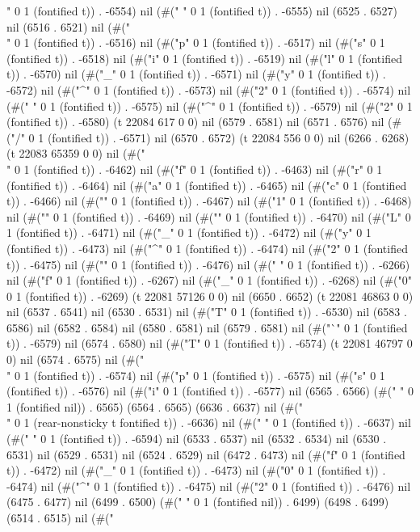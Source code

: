 " 0 1 (fontified t)) . -6554) nil (#(" " 0 1 (fontified t)) . -6555) nil (6525 . 6527) nil (6516 . 6521) nil (#("\\" 0 1 (fontified t)) . -6516) nil (#("p" 0 1 (fontified t)) . -6517) nil (#("s" 0 1 (fontified t)) . -6518) nil (#("i" 0 1 (fontified t)) . -6519) nil (#("l" 0 1 (fontified t)) . -6570) nil (#("_" 0 1 (fontified t)) . -6571) nil (#("y" 0 1 (fontified t)) . -6572) nil (#("^" 0 1 (fontified t)) . -6573) nil (#("2" 0 1 (fontified t)) . -6574) nil (#(" " 0 1 (fontified t)) . -6575) nil (#("^" 0 1 (fontified t)) . -6579) nil (#("2" 0 1 (fontified t)) . -6580) (t 22084 617 0 0) nil (6579 . 6581) nil (6571 . 6576) nil (#("/" 0 1 (fontified t)) . -6571) nil (6570 . 6572) (t 22084 556 0 0) nil (6266 . 6268) (t 22083 65359 0 0) nil (#("\\" 0 1 (fontified t)) . -6462) nil (#("f" 0 1 (fontified t)) . -6463) nil (#("r" 0 1 (fontified t)) . -6464) nil (#("a" 0 1 (fontified t)) . -6465) nil (#("c" 0 1 (fontified t)) . -6466) nil (#("{" 0 1 (fontified t)) . -6467) nil (#("1" 0 1 (fontified t)) . -6468) nil (#("}" 0 1 (fontified t)) . -6469) nil (#("{" 0 1 (fontified t)) . -6470) nil (#("L" 0 1 (fontified t)) . -6471) nil (#("_" 0 1 (fontified t)) . -6472) nil (#("y" 0 1 (fontified t)) . -6473) nil (#("^" 0 1 (fontified t)) . -6474) nil (#("2" 0 1 (fontified t)) . -6475) nil (#("}" 0 1 (fontified t)) . -6476) nil (#(" " 0 1 (fontified t)) . -6266) nil (#("f" 0 1 (fontified t)) . -6267) nil (#("_" 0 1 (fontified t)) . -6268) nil (#("0" 0 1 (fontified t)) . -6269) (t 22081 57126 0 0) nil (6650 . 6652) (t 22081 46863 0 0) nil (6537 . 6541) nil (6530 . 6531) nil (#("T" 0 1 (fontified t)) . -6530) nil (6583 . 6586) nil (6582 . 6584) nil (6580 . 6581) nil (6579 . 6581) nil (#("`" 0 1 (fontified t)) . -6579) nil (6574 . 6580) nil (#("T" 0 1 (fontified t)) . -6574) (t 22081 46797 0 0) nil (6574 . 6575) nil (#("\\" 0 1 (fontified t)) . -6574) nil (#("p" 0 1 (fontified t)) . -6575) nil (#("s" 0 1 (fontified t)) . -6576) nil (#("i" 0 1 (fontified t)) . -6577) nil (6565 . 6566) (#(" " 0 1 (fontified nil)) . 6565) (6564 . 6565) (6636 . 6637) nil (#("\\" 0 1 (rear-nonsticky t fontified t)) . -6636) nil (#("
" 0 1 (fontified t)) . -6637) nil (#("
" 0 1 (fontified t)) . -6594) nil (6533 . 6537) nil (6532 . 6534) nil (6530 . 6531) nil (6529 . 6531) nil (6524 . 6529) nil (6472 . 6473) nil (#("f" 0 1 (fontified t)) . -6472) nil (#("_" 0 1 (fontified t)) . -6473) nil (#("0" 0 1 (fontified t)) . -6474) nil (#("^" 0 1 (fontified t)) . -6475) nil (#("2" 0 1 (fontified t)) . -6476) nil (6475 . 6477) nil (6499 . 6500) (#(" " 0 1 (fontified nil)) . 6499) (6498 . 6499) (6514 . 6515) nil (#("
